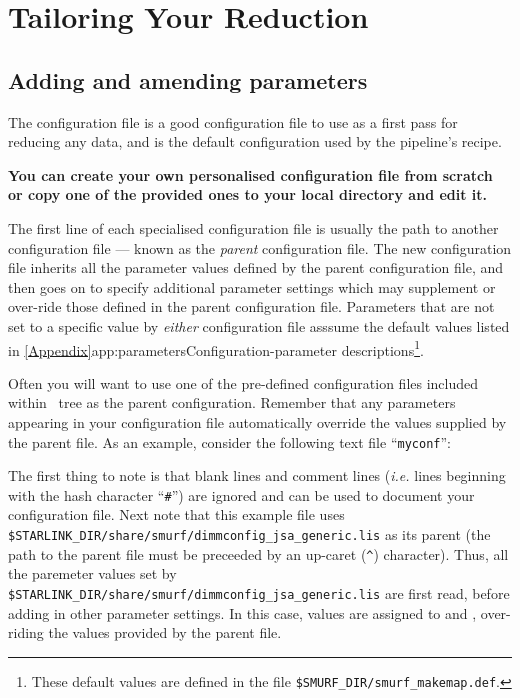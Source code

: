 \chapter{Tailoring Your Reduction}
\label{sec:tweak}


\section{Adding and amending parameters}
The configuration file  is a good
configuration file to use as a first pass for reducing any data, and is
the default configuration used by the pipeline's 
recipe.

\textbf{You can create your own personalised configuration file from
scratch or copy one of the provided ones to your local directory and
edit it.}

The first line of each specialised configuration file is usually the path
to another configuration file --- known as the \emph{parent} configuration
file. The new configuration file inherits all the parameter values
defined by the parent configuration file, and then goes on to specify
additional parameter settings which may supplement or over-ride those
defined in the parent configuration file. Parameters that are not set to
a specific value by \emph{either} configuration file asssume the default
values listed in \cref{Appendix}{app:parameters}{Configuration-parameter
descriptions}\footnote{These default values are defined in the file
\texttt{\$SMURF\_DIR/smurf\_makemap.def}.}.

Often you will want to use one of the pre-defined configuration files
included within \starlink\ tree as the parent configuration. Remember
that any parameters appearing in your configuration file
automatically override the values supplied by the parent file. As an
example, consider the following text file ``\texttt{myconf}'':


The first thing to note is that blank lines and comment lines
(\emph{i.e.} lines beginning with the hash character ``\texttt{\#}'') are
ignored and can be used to document your configuration file. Next note
that this example file uses
\texttt{\$STARLINK\_DIR/share/smurf/dimmconfig\_jsa\_generic.lis} as its
parent (the path to the parent file must be preceeded
by an up-caret (\texttt{\^}) character). Thus, all the paremeter values
set by \texttt{\$STARLINK\_DIR/share/smurf/dimmconfig\_jsa\_generic.lis} are
first read, before adding in other parameter settings. In this case, values
are assigned to  and , over-riding the
values provided by the parent file.

